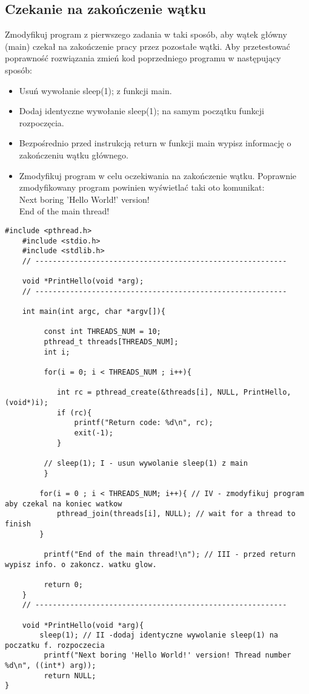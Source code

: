 \documentclass[a4paper,15pt]{article}
\newcommand{\assignment}[2]{
    \begin{tcolorbox}[colback=black!5!white,colframe=black,title={Zadanie #1}]
        #2
    \end{tcolorbox}
}
\begin{document}
\subsection{Czekanie na zakończenie wątku}
\assignment{2}{Zmodyfikuj program z pierwszego zadania w taki sposób, aby wątek główny (main) czekał na zakończenie pracy przez pozostałe wątki. Aby przetestować poprawność rozwiązania zmień kod poprzedniego programu w następujący sposób:
\begin{itemize}
\item Usuń wywołanie sleep(1); z funkcji main.
\item Dodaj identyczne wywołanie sleep(1); na samym początku funkcji rozpoczęcia.
\item Bezpośrednio przed instrukcją return w funkcji main wypisz informację o zakończeniu wątku głównego.
\item Zmodyfikuj program w celu oczekiwania na zakończenie wątku. Poprawnie zmodyfikowany program powinien wyświetlać taki oto komunikat: \\ 
Next boring 'Hello World!' version! \\
End of the main thread!
\end{itemize}
}

\begin{lstlisting}[style=CStyle, label=some-code, caption=Zadanie 2 - hello.c]
 #include <pthread.h>
    #include <stdio.h>
    #include <stdlib.h>
    // ----------------------------------------------------------
     
    void *PrintHello(void *arg);
    // ----------------------------------------------------------
     
    int main(int argc, char *argv[]){

         const int THREADS_NUM = 10;
         pthread_t threads[THREADS_NUM];
         int i;

         for(i = 0; i < THREADS_NUM ; i++){
            
            int rc = pthread_create(&threads[i], NULL, PrintHello, (void*)i);
            if (rc){
                printf("Return code: %d\n", rc);
                exit(-1);
            }
            
         // sleep(1); I - usun wywolanie sleep(1) z main
         }

        for(i = 0 ; i < THREADS_NUM; i++){ // IV - zmodyfikuj program aby czekal na koniec watkow
            pthread_join(threads[i], NULL); // wait for a thread to finish
        }

         printf("End of the main thread!\n"); // III - przed return wypisz info. o zakoncz. watku glow.
        
         return 0;
    }
    // ----------------------------------------------------------
     
    void *PrintHello(void *arg){
        sleep(1); // II -dodaj identyczne wywolanie sleep(1) na poczatku f. rozpoczecia
         printf("Next boring 'Hello World!' version! Thread number %d\n", ((int*) arg));
         return NULL;
}
\end{lstlisting}
\end{document}
